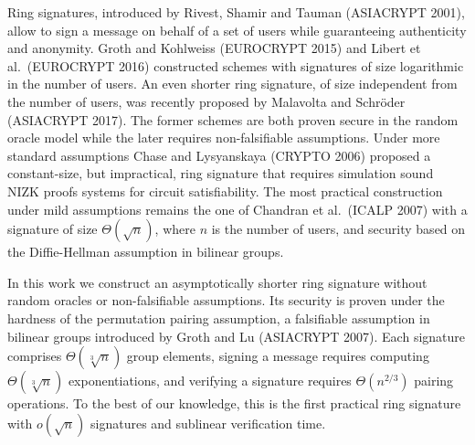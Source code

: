 
Ring signatures, introduced by Rivest, Shamir and Tauman (ASIACRYPT 2001), allow to sign a message on behalf of a set of users while guaranteeing authenticity and anonymity. Groth and Kohlweiss (EUROCRYPT 2015) and Libert et al.~(EUROCRYPT 2016) constructed schemes with signatures of size logarithmic in the number of users. An even shorter ring signature, of size independent from the number of users, was recently proposed by Malavolta and  Schr\"oder (ASIACRYPT 2017).
The former schemes are both proven secure in the random oracle model while the later requires non-falsifiable assumptions.
Under more standard assumptions Chase and Lysyanskaya (CRYPTO 2006) proposed a constant-size, but impractical, ring signature that requires simulation sound NIZK proofs systems for circuit satisfiability.
The most practical construction under mild assumptions remains the one of Chandran et al.~(ICALP 2007) with a signature of size $\Theta(\sqrt{n})$, where $n$ is the number of users, and security based on the Diffie-Hellman assumption in bilinear groups.

In this work we construct an asymptotically shorter ring signature without random oracles or non-falsifiable assumptions. Its security is proven under the hardness of the permutation pairing assumption, a falsifiable assumption in bilinear groups introduced by Groth and Lu (ASIACRYPT 2007).
 Each signature comprises $\Theta(\sqrt[3]{n})$ group elements, signing a message requires computing $\Theta(\sqrt[3]{n})$ exponentiations, and verifying a signature requires $\Theta(n^{2/3})$ pairing operations. To the best of our knowledge, this is the first practical ring signature with $o(\sqrt{n})$ signatures and sublinear verification time.
